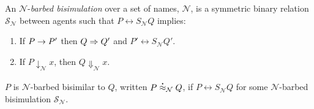 \begin{definition}
An  ${\mathcal N}$-\emph{barbed bisimulation} over a set of names, ${\mathcal N}$, is a symmetric binary relation 
${\mathcal S}_{\mathcal N}$ between agents such that $P\rel{S}_{\mathcal N}Q$ implies:
\begin{enumerate}
\item If $P \rightarrow P'$ then $Q \Rightarrow Q'$ and $P'\rel{S}_{\mathcal N} Q'$.
\item If $P\downarrow_{\mathcal N} x$, then $Q\Downarrow_{\mathcal N} x$.
\end{enumerate}
$P$ is ${\mathcal N}$-barbed bisimilar to $Q$, written
$P \stackrel{\centerdot}{\approx}_{\mathcal N} Q$, if $P \rel{S}_{\mathcal N} Q$ for some ${\mathcal N}$-barbed bisimulation ${\mathcal S}_{\mathcal N}$.
\end{definition}





